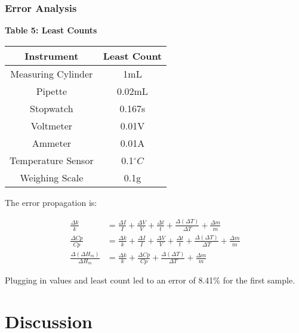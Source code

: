 \documentclass[11pt]{article}
\begin{document}
\hypertarget{error-analysis}{%
  \subsubsection{Error Analysis}\label{error-analysis}}

\textbf{Table 5: Least Counts}

\begin{table}[h]
  \centering
  \begin{tabular}{|c|c|}
    \hline
    Instrument         & Least Count      \\
    \hline
    Measuring Cylinder & 1mL              \\
    \hline
    Pipette            & 0.02mL           \\
    \hline
    Stopwatch          & 0.167s           \\
    \hline
    Voltmeter          & 0.01V            \\
    \hline
    Ammeter            & 0.01A            \\
    \hline
    Temperature Sensor & 0.1\(^{\circ}C\) \\
    \hline
    Weighing Scale     & 0.1g             \\
    \hline
  \end{tabular}
\end{table}

The error propagation is:

\begin{equation}
  \begin{split}
    \frac{\Delta k}{k}&=\frac{\Delta I}{I}+\frac{\Delta V}{V}+\frac{\Delta t}{t}+\frac{\Delta (\Delta T)}{\Delta T}+\frac{\Delta m}{m}\\
    \frac{\Delta Cp}{Cp}&=\frac{\Delta k}{k}+\frac{\Delta I}{I}+\frac{\Delta V}{V}+\frac{\Delta t}{t}+\frac{\Delta (\Delta T)}{\Delta T}+\frac{\Delta m}{m} \\
    \frac{\Delta (\Delta H_m)}{\Delta H_m}&=\frac{\Delta k}{k}+\frac{\Delta Cp}{Cp}+\frac{\Delta(\Delta T)}{\Delta T}+\frac{\Delta m}{m}
  \end{split}
\end{equation}

Plugging in values and least count led to an error of 8.41\% for the
first sample.

\hypertarget{discussion}{%
  \section{Discussion}\label{discussion}}
\end{document}
